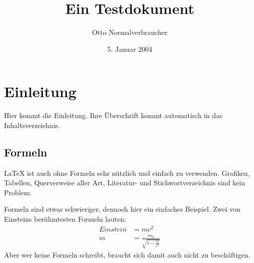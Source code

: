\documentclass{article}
\title{Ein Testdokument}
\author{Otto Normalverbraucher}
\date{5. Januar 2004}
\begin{document}
\maketitle
\tableofcontents
\section{Einleitung}

Hier kommt die Einleitung. Ihre Überschrift kommt
automatisch in das Inhaltsverzeichnis.

\subsection{Formeln}
\LaTeX{} ist auch ohne Formeln sehr nützlich und
einfach zu verwenden. Grafiken, Tabellen,
Querverweise aller Art, Literatur- und
Stichwortverzeichnis sind kein Problem.

Formeln sind etwas schwieriger, dennoch hier ein
einfaches Beispiel. Zwei von Einsteins
berühmtesten Formeln lauten:
\begin{align}
Einstein &= mc^2 \\
m &= \frac{m_0}{\sqrt{1-\frac{v^2}{c^2}}}
\end{align}
Aber wer keine Formeln schreibt, braucht sich
damit auch nicht zu beschäftigen.
\end{document}
